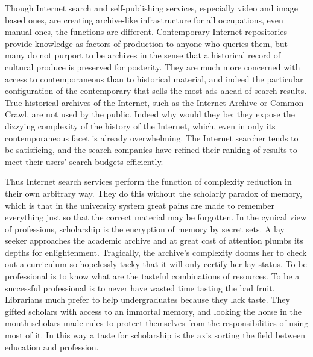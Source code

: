 \documentclass[]{book}
\theoremstyle{definition}
\theoremstyle{definition}
\theoremstyle{definition}
\theoremstyle{remark}
\begin{document}
Though Internet search and self-publishing services, especially video
and image based ones, are creating archive-like infrastructure for all
occupations, even manual ones, the functions are different. Contemporary
Internet repositories provide knowledge as factors of production to
anyone who queries them, but many do not purport to be archives in the
sense that a historical record of cultural produce is preserved for
posterity. They are much more concerned with access to contemporaneous
than to historical material, and indeed the particular configuration of
the contemporary that sells the most ads ahead of search results. True
historical archives of the Internet, such as the Internet Archive or
Common Crawl, are not used by the public. Indeed why would they be; they
expose the dizzying complexity of the history of the Internet, which,
even in only its contemporaneous facet is already overwhelming. The
Internet searcher tends to be satisficing, and the search companies have
refined their ranking of results to meet their users' search budgets
efficiently.

Thus Internet search services perform the function of complexity
reduction in their own arbitrary way. They do this without the scholarly
paradox of memory, which is that in the university system great pains
are made to remember everything just so that the correct material may be
forgotten. In the cynical view of professions, scholarship is the
encryption of memory by secret sets. A lay seeker approaches the
academic archive and at great cost of attention plumbs its depths for
enlightenment. Tragically, the archive's complexity dooms her to check
out a curriculum so hopelessly tacky that it will only certify her lay
status. To be professional is to know what are the tasteful combinations
of resources. To be a successful professional is to never have wasted
time tasting the bad fruit. Librarians much prefer to help
undergraduates because they lack taste. They gifted scholars with access
to an immortal memory, and looking the horse in the mouth scholars made
rules to protect themselves from the responsibilities of using most of
it. In this way a taste for scholarship is the axis sorting the field
between education and profession.
\end{document}
